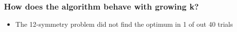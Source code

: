 \begin{frame}
\frametitle{
How does the algorithm behave with growing k?
}
\begin{itemize}
\item The 12-symmetry problem did not find the optimum in 1 of out 40 trials
\end{itemize}
\end{frame}